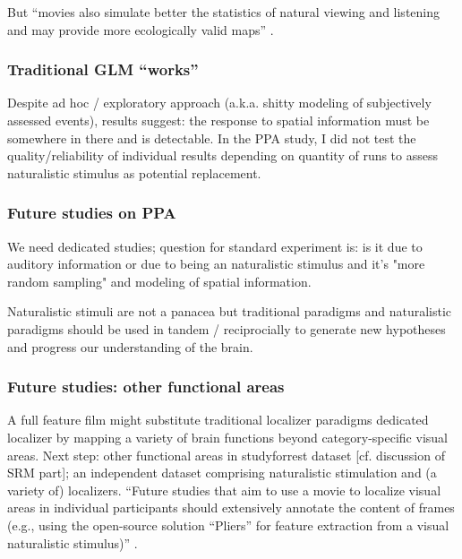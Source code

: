 %
But ``movies also simulate better the statistics of natural viewing and
listening and may provide more ecologically valid maps''
\citep{jiahui2020predicting}.

\subsubsection{Traditional GLM ``works''}
%
Despite ad hoc / exploratory approach (a.k.a. shitty modeling of subjectively
assessed events), results suggest: the response to spatial information must be
somewhere in there and is detectable.
%
In the PPA study,  I did not test the quality/reliability of individual results
depending on quantity of runs to assess naturalistic stimulus as potential
replacement.


\subsubsection{Future studies on PPA}

%
We need dedicated studies; question for standard experiment is: is it due to
auditory information or due to being an naturalistic stimulus and it's "more
random sampling" and modeling of spatial information.

%
Naturalistic stimuli are not a panacea but traditional paradigms and
naturalistic paradigms should be used in tandem / reciprocially to generate new
hypotheses and progress our understanding of the brain.


\subsubsection{Future studies: other functional areas}
%
A full feature film might substitute traditional localizer paradigms dedicated
localizer by mapping a variety of brain functions beyond category-specific
visual areas.
%
Next step: other functional areas in studyforrest dataset [cf. discussion of SRM
part]; an independent dataset comprising naturalistic stimulation and (a variety
of) localizers.
%
``Future studies that aim to use a movie to localize visual areas in individual
participants should extensively annotate the content of frames (e.g., using the
open-source solution ``Pliers''\citep{mcnamara2017developing} for feature
extraction from a visual naturalistic stimulus)''
\citep{haeusler2022processing}.


